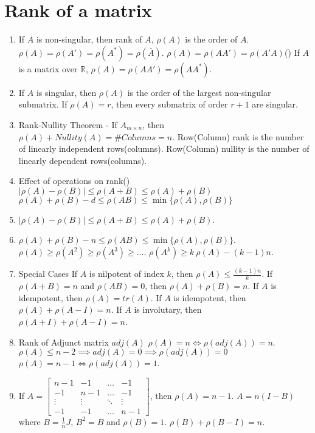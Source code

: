 \section{Rank of a matrix}
\begin{enumerate}
	\item If $A$ is non-singular, then rank of $A$, $\rho(A)$ is the order of $A$.
		\subitem $\rho(A) = \rho(A') = \rho(A^\ast) = \rho(\bar{A})$.
		\subitem $\rho(A) = \rho(AA') = \rho(A'A)$(\citeauthor{charu})
		\subitem If $A$ is a matrix over $\mathbb{R}$, $\rho(A) = \rho(AA') = \rho(AA^\ast)$.
	\item If $A$ is singular, then $\rho(A)$ is the order of the largest non-singular submatrix.
		\subitem If $\rho(A) = r$, then every submatrix of order $r+1$ are singular.
	\item Rank-Nullity Theorem - If $A_{m \times n}$, then $\rho(A) + Nullity(A) = \# Columns = n$.
		\subitem Row(Column) rank is the number of linearly independent rows(columns).
		\subitem Row(Column) nullity is the number of linearly dependent rows(columns).
	\item Effect of operations on rank(\citeauthor{charu})
		\subitem $|\rho(A)-\rho(B)| \le \rho(A+B) \le \rho(A)+\rho(B)$
		\subitem $\rho(A)+\rho(B)-d \le \rho(AB) \le \min\{ \rho(A),\rho(B) \}$
	\item $|\rho(A)-\rho(B)| \le \rho(A+B) \le \rho(A)+\rho(B)$.
	\item $\rho(A)+\rho(B)-n \le \rho(AB) \le \min\{ \rho(A),\rho(B) \}$.
		\subitem $\rho(A) \ge \rho(A^2) \ge \rho(A^3) \ge \dots$.
		\subitem $\rho(A^k) \ge k\ \rho(A) - (k-1)n$.
	\item Special Cases
		\subitem If $A$ is nilpotent of index $k$, then $\rho(A) \le \frac{(k-1)n}{k}$.
		\subitem If $\rho(A+B) = n$ and $\rho(AB) = 0$, then $\rho(A) + \rho(B) = n$.
		\subitem If $A$ is idempotent, then $\rho(A) = tr(A)$.
		\subitem If $A$ is idempotent, then $\rho(A) + \rho(A-I) = n$.
		\subitem If $A$ is involutary, then $\rho(A+I)+\rho(A-I) = n$.
	\item Rank of Adjunct matrix $adj(A)$
		\subitem $\rho(A) = n \iff \rho(adj(A)) = n$.
		\subitem $\rho(A) \le n-2 \implies adj(A) = 0 \implies \rho(adj(A)) = 0$
		\subitem $\rho(A) = n-1 \iff \rho(adj(A)) = 1$.
	\item If $A = \begin{bmatrix} n-1 & -1 & \dots & -1 \\ -1 & n-1 & \dots & -1 \\ \vdots & \vdots & \ddots & \vdots \\ -1 & - 1 & \dots & n-1 \end{bmatrix}$, then $\rho(A) = n-1$.
		\subitem $A = n(I - B)$ where $B = \frac{1}{n}J$, $B^2 = B$ and $\rho(B) = 1$. $\rho(B) + \rho(B-I) = n$.
\end{enumerate}

